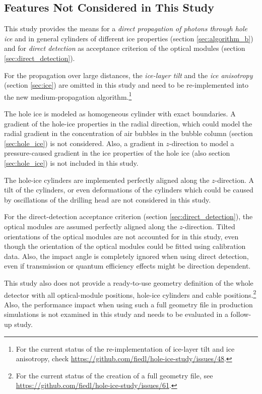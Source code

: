 
\subsection{Features Not Considered in This Study}
\label{sec:ice_features_not_considered}

This study provides the means for a \textit{direct propagation of photons through hole ice} and in general cylinders of different ice properties (section \ref{sec:algorithm_b}) and for \textit{direct detection} as acceptance criterion of the optical modules (section \ref{sec:direct_detection}).

For the propagation over large distances, the \textit{ice-layer tilt} and the \textit{ice anisotropy} (section \ref{sec:ice}) are omitted in this study and need to be re-implemented into the new medium-propagation algorithm.\footnote{For the current status of the re-implementation of ice-layer tilt and ice anisotropy, check \url{https://github.com/fiedl/hole-ice-study/issues/48}.}

The hole ice is modeled as homogeneous cylinder with exact boundaries. A gradient of the hole-ice properties in the radial direction, which could model the radial gradient in the concentration of air bubbles in the bubble column (section \ref{sec:hole_ice}) is not considered. Also, a gradient in $z$-direction to model a pressure-caused gradient in the ice properties of the hole ice (also section \ref{sec:hole_ice}) is not included in this study.

The hole-ice cylinders are implemented perfectly aligned along the $z$-direction. A tilt of the cylinders, or even deformations of the cylinders which could be caused by oscillations of the drilling head are not considered in this study.

For the direct-detection acceptance criterion (section \ref{sec:direct_detection}), the optical modules are assumed perfectly aligned along the $z$-direction. Tilted orientations of the optical modules are not accounted for in this study, even though the orientation of the optical modules could be fitted using calibration data. Also, the impact angle is completely ignored when using direct detection, even if transmission or quantum efficiency effects might be direction dependent.

This study also does not provide a ready-to-use geometry definition of the whole detector with all optical-module positions, hole-ice cylinders and cable positions.\footnote{For the current status of the creation of a full geometry file, see \url{https://github.com/fiedl/hole-ice-study/issues/61}.} Also, the performance impact when using such a full geometry file in production simulations is not examined in this study and needs to be evaluated in a follow-up study.\followup

